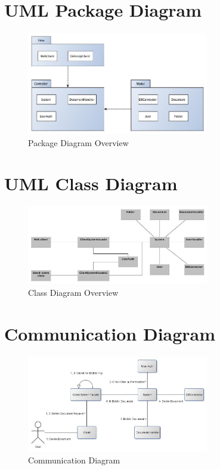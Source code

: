 \documentclass[11pt,a4paper]{article}
\begin{document}
\section{UML Package Diagram}
	\begin{figure}[H]
  		\centering
    	\includegraphics[width=300px]{images/PackageDiagramOverview.jpg}
    	\caption{Package Diagram Overview}
	\end{figure}

\section{UML Class Diagram}
	\begin{figure}[H]
  		\centering
    	\includegraphics[width=300px]{images/LatestClassDiagram.jpg}
    	\caption{Class Diagram Overview}
	\end{figure}
	
\section{Communication Diagram}
	\begin{figure}[H]
  		\centering
    	\includegraphics[width=300px]{images/Communication Diagrams/Delete Communication Diagram.jpg}
    	\caption{Communication Diagram}
	\end{figure}
\end{document}
